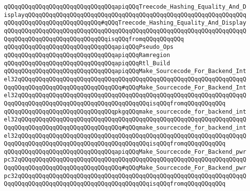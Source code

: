 \verb|qQQqqQQqqQQqqQQqqQQqqQQqqQQqqQQqapiqQQqTreecode_Hashing_Equality_And_DisplayqQQqqQQqqQQqqQQqqQQqqQQqqQQqqQQqqQQqqQQqqQQqqQQqqQQqqQQqqQQqqQQqqQQqqQQqqQQqqQQqqQQqqQQqqQQq#qQQqTreecode_Hashing_Equality_And_DisplayqQQqqQQqqQQqqQQqqQQqqQQqqQQqqQQqqQQqqQQqqQQqqQQqqQQqqQQqqQQqqQQqqQQqqQQqqQQqqQQqqQQqqQQqqQQqqQQqqQQqisqQQqfromqQQqqQQqqQQq|\newline
\verb|qQQqqQQqqQQqqQQqqQQqqQQqqQQqqQQqapiqQQqPseudo_Ops|\newline
\verb|qQQqqQQqqQQqqQQqqQQqqQQqqQQqqQQqapiqQQqRamregion|\newline
\verb|qQQqqQQqqQQqqQQqqQQqqQQqqQQqqQQqapiqQQqRtl_Build|\newline
\newline
\verb|qQQqqQQqqQQqqQQqqQQqqQQqqQQqqQQqapiqQQqMake_Sourcecode_For_Backend_Intel32qQQqqQQqqQQqqQQqqQQqqQQqqQQqqQQqqQQqqQQqqQQqqQQqqQQqqQQqqQQqqQQqqQQqqQQqqQQqqQQqqQQqqQQqqQQqqQQqqQQq#qQQqMake_Sourcecode_For_Backend_Intel32qQQqqQQqqQQqqQQqqQQqqQQqqQQqqQQqqQQqqQQqqQQqqQQqqQQqqQQqqQQqqQQqqQQqqQQqqQQqqQQqqQQqqQQqqQQqqQQqqQQqqQQqqQQqisqQQqfromqQQqqQQqqQQq|\newline
\verb|qQQqqQQqqQQqqQQqqQQqqQQqqQQqqQQqpkgqQQqmake_sourcecode_for_backend_intel32qQQqqQQqqQQqqQQqqQQqqQQqqQQqqQQqqQQqqQQqqQQqqQQqqQQqqQQqqQQqqQQqqQQqqQQqqQQqqQQqqQQqqQQqqQQqqQQqqQQq#qQQqmake_sourcecode_for_backend_intel32qQQqqQQqqQQqqQQqqQQqqQQqqQQqqQQqqQQqqQQqqQQqqQQqqQQqqQQqqQQqqQQqqQQqqQQqqQQqqQQqqQQqqQQqqQQqqQQqqQQqqQQqqQQqisqQQqfromqQQqqQQqqQQq|\newline
\newline
\verb|qQQqqQQqqQQqqQQqqQQqqQQqqQQqqQQqapiqQQqMake_Sourcecode_For_Backend_pwrpc32qQQqqQQqqQQqqQQqqQQqqQQqqQQqqQQqqQQqqQQqqQQqqQQqqQQqqQQqqQQqqQQqqQQqqQQqqQQqqQQqqQQqqQQqqQQqqQQqqQQq#qQQqMake_Sourcecode_For_Backend_pwrpc32qQQqqQQqqQQqqQQqqQQqqQQqqQQqqQQqqQQqqQQqqQQqqQQqqQQqqQQqqQQqqQQqqQQqqQQqqQQqqQQqqQQqqQQqqQQqqQQqqQQqqQQqqQQqisqQQqfromqQQqqQQqqQQq|\newline
